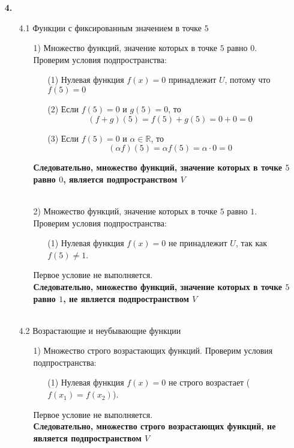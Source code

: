 \documentclass[a4paper]{article}
\begin{document}
\begin{enumerate}
    \item[\textbf{4.}]
    \begin{enumerate}
        \item[4.1]Функции с фиксированным значением в точке \( 5 \)
        \begin{enumerate}
            \item[1)]Множество функций, значение которых в точке \( 5 \) равно \( 0 \). Проверим условия подпространства:
            \begin{enumerate}
                \item[(1)]Нулевая функция \( f(x) = 0 \) принадлежит \( U \), потому что \( f(5) = 0 \)
                \item[(2)]Если \( f(5) = 0 \) и \( g(5) = 0 \), то $$ (f + g)(5) = f(5) + g(5) = 0 + 0 = 0 $$
                \item[(3)]Если \( f(5) = 0 \) и \( \alpha \in \mathbb{R} \), то 
                $$(\alpha f)(5) = \alpha f(5) = \alpha \cdot 0 = 0 $$
            \end{enumerate}
            \textbf{Следовательно, множество функций, значение которых в точке \( 5 \) равно \( 0 \),  является подпространством $V$}\\\\

            \item[2)]Множество функций, значение которых в точке \( 5 \) равно \( 1 \). Проверим условия подпространства:
            \begin{enumerate}
                \item[(1)]Нулевая функция \( f(x) = 0 \) не принадлежит \( U \), так как \( f(5) \neq 1 \).
            \end{enumerate}
            Первое условие не выполняется.\\
            \textbf{Следовательно, множество функций, значение которых в точке \( 5 \) равно \( 1 \), не является подпространством $V$}\\\\
        \end{enumerate}

        \item[4.2]Возрастающие и неубывающие функции
        \begin{enumerate}
            \item[1)]Множество строго возрастающих функций. Проверим условия подпространства:
            \begin{enumerate}
                \item[(1)]Нулевая функция \( f(x) = 0 \) не строго возрастает (\( f(x_1) = f(x_2) \)).
            \end{enumerate}
            Первое условие не выполняется.\\
            \textbf{Следовательно, множество строго возрастающих функций, не является подпространством $V$}\\\\


\end{enumerate}
\end{enumerate}
\end{enumerate}
\end{document}
